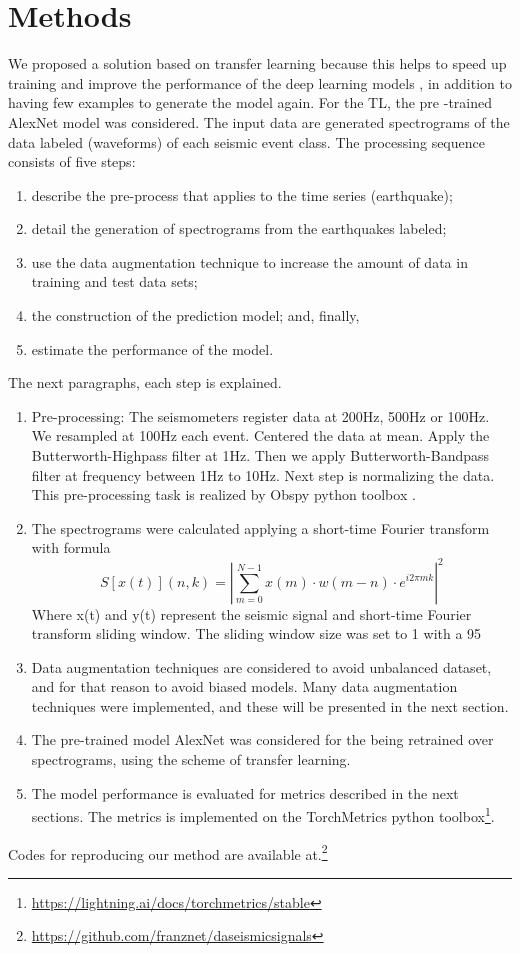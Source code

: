 \documentclass[journal]{IEEEtran}
\begin{document}
\section{Methods}
We proposed a solution based on transfer learning because this helps to speed up training and improve the performance of the deep learning models \cite{titos2019classification,bueno2019volcano}, in addition to having few examples to generate the model again. For the TL, the pre -trained AlexNet\cite{krizhevsky2012imagenet} model was considered.
The input data are generated spectrograms of the data labeled (waveforms) of each seismic event class. The processing sequence consists of five steps:
\begin{enumerate}
 \item describe the pre-process that applies to the time series (earthquake); 
 \item detail the generation of spectrograms from the earthquakes labeled; 
 \item use the data augmentation technique to increase the amount of data in training and test data sets; 
 \item the construction of the prediction model; and, finally, 
 \item estimate the performance of the model.
\end{enumerate}
The next paragraphs, each step is explained.
\begin{enumerate}
	\item Pre-processing: The seismometers register data at 200Hz, 500Hz or 100Hz. We resampled at 100Hz each event. Centered the data at mean. Apply the Butterworth-Highpass filter at 1Hz. Then we apply Butterworth-Bandpass filter at frequency between 1Hz to 10Hz. Next step is normalizing the data. This pre-processing task is realized by Obspy python toolbox \cite{beyreuther2010obspy}.
	\item The spectrograms were calculated applying a short-time Fourier transform with formula
$$
S[x(t)](n,k)=\left|\sum_{m=0}^{N-1}x(m)\cdot w(m-n)\cdot e^{i2\pi mk}\right|^2$$
Where x(t) and y(t) represent the seismic signal and short-time Fourier transform sliding window. The sliding window size was set to 1 with a 95%
	\item Data augmentation techniques are considered to avoid unbalanced dataset, and for that reason to avoid biased models. Many data augmentation techniques were implemented, and these will be presented in the next section.
	\item The pre-trained model AlexNet\cite{krizhevsky2012imagenet} was considered for the being retrained over spectrograms, using the scheme of transfer learning.
	\item The model performance is evaluated for metrics described in the next sections. The metrics is implemented on the TorchMetrics python toolbox\footnote{\href{https://lightning.ai/docs/torchmetrics/stable}{\color{blue}https://lightning.ai/docs/torchmetrics/stable}}.
\end{enumerate}
Codes for reproducing our method are available at.\footnote{\href{https://github.com/franznet/daseismicsignals}{\color{blue}https://github.com/franznet/daseismicsignals}}
\end{document}
